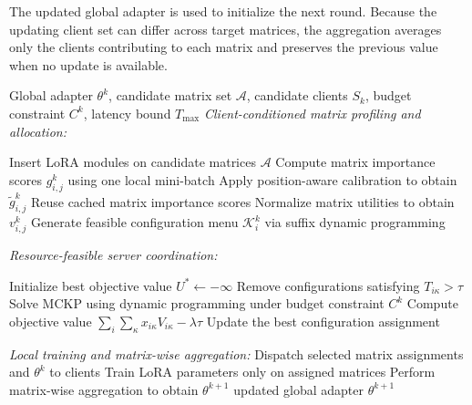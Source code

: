 \documentclass[10pt,conference,letterpaper]{IEEEtran}
\newcommand{\method}{FedMATRIX-LoRA}
\begin{document}
The updated global adapter is used to initialize the next round. Because the updating client set can differ across target matrices, the aggregation averages only the clients contributing to each matrix and preserves the previous value when no update is available.
\begin{algorithm}[t]
\caption{\method{} in communication round $k$}
\label{alg:fedmatrix}
\footnotesize
\begin{algorithmic}[1]
\Require
Global adapter \(\theta^k\),
candidate matrix set \(\mathcal A\),
candidate clients \(S_k\),
budget constraint \(C^k\),
latency bound \(T_{\max}\)
\Statex \hrulefill
\Statex \textit{Client-conditioned matrix profiling and allocation:}

        \State Insert LoRA modules on candidate matrices \(\mathcal A\)
        \State Compute matrix importance scores
        \(g_{i,j}^k\) using one local mini-batch
        \State Apply position-aware calibration
        to obtain \(\widetilde g_{i,j}^k\)
    \Else
        \State Reuse cached matrix importance scores
    \EndIf
    \State Normalize matrix utilities to obtain \(v_{i,j}^k\)
    \State Generate feasible configuration menu
    \(\mathcal K_i^k\) via suffix dynamic programming
\EndFor

\Statex \hrulefill
\Statex \textit{Resource-feasible server coordination:}

\State Initialize best objective value \(U^*\leftarrow -\infty\)
    \State Remove configurations satisfying
    \(T_{i\kappa}>\tau\)
    \State Solve MCKP using dynamic programming
    under budget constraint \(C^k\)
    \State Compute objective value
    \(\sum_i\sum_{\kappa}x_{i\kappa}V_{i\kappa}
    -\lambda\tau\)
        \State Update the best configuration assignment
    \EndIf
\EndFor

\Statex \hrulefill
\Statex \textit{Local training and matrix-wise aggregation:}
\State Dispatch selected matrix assignments and \(\theta^k\) to clients
    \State Train LoRA parameters only on assigned matrices
\EndFor
\State Perform matrix-wise aggregation to obtain
\(\theta^{k+1}\)
\State \Return updated global adapter \(\theta^{k+1}\)
\end{algorithmic}
\end{algorithm}
\end{document}
